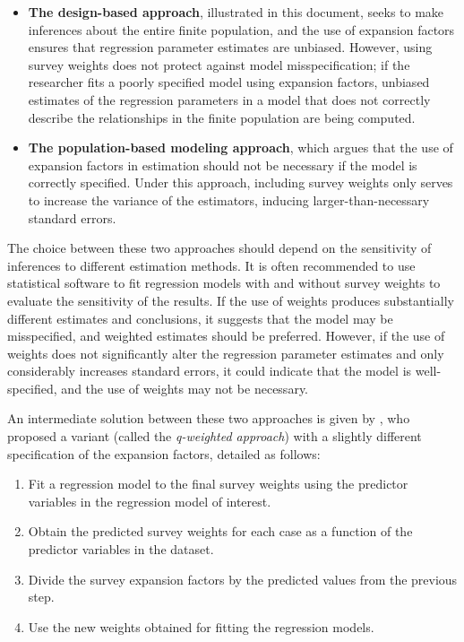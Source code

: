 \documentclass[
  12pt,
]{book}
\providecommand{\tightlist}{%
  \setlength{\itemsep}{0pt}\setlength{\parskip}{0pt}}
\begin{document}
\begin{itemize}
\tightlist
\item
  \textbf{The design-based approach}, illustrated in this document, seeks to make inferences about the entire finite population, and the use of expansion factors ensures that regression parameter estimates are unbiased. However, using survey weights does not protect against model misspecification; if the researcher fits a poorly specified model using expansion factors, unbiased estimates of the regression parameters in a model that does not correctly describe the relationships in the finite population are being computed.
\item
  \textbf{The population-based modeling approach}, which argues that the use of expansion factors in estimation should not be necessary if the model is correctly specified. Under this approach, including survey weights only serves to increase the variance of the estimators, inducing larger-than-necessary standard errors.
\end{itemize}

The choice between these two approaches should depend on the sensitivity of inferences to different estimation methods. It is often recommended to use statistical software to fit regression models with and without survey weights to evaluate the sensitivity of the results. If the use of weights produces substantially different estimates and conclusions, it suggests that the model may be misspecified, and weighted estimates should be preferred. However, if the use of weights does not significantly alter the regression parameter estimates and only considerably increases standard errors, it could indicate that the model is well-specified, and the use of weights may not be necessary.

An intermediate solution between these two approaches is given by \citet{pfeffermann2011modelling}, who proposed a variant (called the \emph{q-weighted approach}) with a slightly different specification of the expansion factors, detailed as follows:

\begin{enumerate}
\def\labelenumi{\arabic{enumi}.}
\tightlist
\item
  Fit a regression model to the final survey weights using the predictor variables in the regression model of interest.
\item
  Obtain the predicted survey weights for each case as a function of the predictor variables in the dataset.
\item
  Divide the survey expansion factors by the predicted values from the previous step.
\item
  Use the new weights obtained for fitting the regression models.
\end{enumerate}
\end{document}

